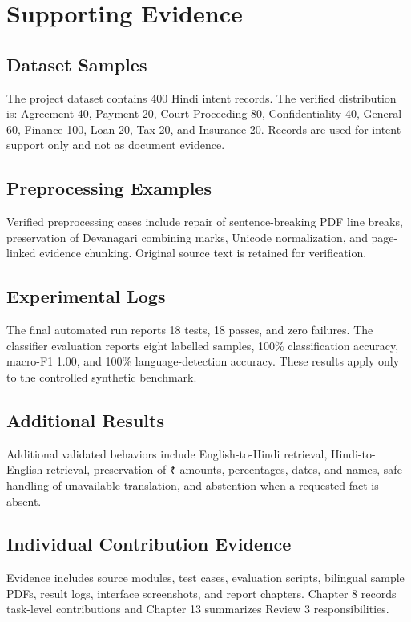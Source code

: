\chapter{Supporting Evidence}

\section{Dataset Samples}
The project dataset contains 400 Hindi intent records. The verified distribution is: Agreement 40, Payment 20, Court Proceeding 80, Confidentiality 40, General 60, Finance 100, Loan 20, Tax 20, and Insurance 20. Records are used for intent support only and not as document evidence.

\section{Preprocessing Examples}
Verified preprocessing cases include repair of sentence-breaking PDF line breaks, preservation of Devanagari combining marks, Unicode normalization, and page-linked evidence chunking. Original source text is retained for verification.

\section{Experimental Logs}
The final automated run reports 18 tests, 18 passes, and zero failures. The classifier evaluation reports eight labelled samples, 100\% classification accuracy, macro-F1 1.00, and 100\% language-detection accuracy. These results apply only to the controlled synthetic benchmark.

\section{Additional Results}
Additional validated behaviors include English-to-Hindi retrieval, Hindi-to-English retrieval, preservation of ₹ amounts, percentages, dates, and names, safe handling of unavailable translation, and abstention when a requested fact is absent.

\section{Individual Contribution Evidence}
Evidence includes source modules, test cases, evaluation scripts, bilingual sample PDFs, result logs, interface screenshots, and report chapters. Chapter 8 records task-level contributions and Chapter 13 summarizes Review 3 responsibilities.
